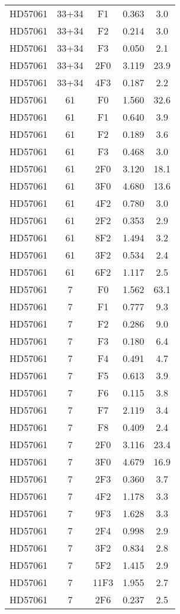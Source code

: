 \begin{table*}
\begin{tabular}{l c c c c}
HD57061 & 33+34 & F1 & 0.363 & 3.0\\ 
HD57061 & 33+34 & F2 & 0.214 & 3.0\\ 
HD57061 & 33+34 & F3 & 0.050 & 2.1\\ 
HD57061 & 33+34 & 2F0 & 3.119 & 23.9\\ 
HD57061 & 33+34 & 4F3 & 0.187 & 2.2\\ 
\hline
HD57061 & 61 & F0 & 1.560 & 32.6\\ 
HD57061 & 61 & F1 & 0.640 & 3.9\\ 
HD57061 & 61 & F2 & 0.189 & 3.6\\ 
HD57061 & 61 & F3 & 0.468 & 3.0\\ 
HD57061 & 61 & 2F0 & 3.120 & 18.1\\ 
HD57061 & 61 & 3F0 & 4.680 & 13.6\\ 
HD57061 & 61 & 4F2 & 0.780 & 3.0\\ 
HD57061 & 61 & 2F2 & 0.353 & 2.9\\ 
HD57061 & 61 & 8F2 & 1.494 & 3.2\\ 
HD57061 & 61 & 3F2 & 0.534 & 2.4\\ 
HD57061 & 61 & 6F2 & 1.117 & 2.5\\ 
\hline
HD57061 & 7 & F0 & 1.562 & 63.1\\ 
HD57061 & 7 & F1 & 0.777 & 9.3\\ 
HD57061 & 7 & F2 & 0.286 & 9.0\\ 
HD57061 & 7 & F3 & 0.180 & 6.4\\ 
HD57061 & 7 & F4 & 0.491 & 4.7\\ 
HD57061 & 7 & F5 & 0.613 & 3.9\\ 
HD57061 & 7 & F6 & 0.115 & 3.8\\ 
HD57061 & 7 & F7 & 2.119 & 3.4\\ 
HD57061 & 7 & F8 & 0.409 & 2.4\\ 
HD57061 & 7 & 2F0 & 3.116 & 23.4\\ 
HD57061 & 7 & 3F0 & 4.679 & 16.9\\ 
HD57061 & 7 & 2F3 & 0.360 & 3.7\\ 
HD57061 & 7 & 4F2 & 1.178 & 3.3\\ 
HD57061 & 7 & 9F3 & 1.628 & 3.3\\ 
HD57061 & 7 & 2F4 & 0.998 & 2.9\\ 
HD57061 & 7 & 3F2 & 0.834 & 2.8\\ 
HD57061 & 7 & 5F2 & 1.415 & 2.9\\ 
HD57061 & 7 & 11F3 & 1.955 & 2.7\\ 
HD57061 & 7 & 2F6 & 0.237 & 2.5\\ 

\end{tabular}
\end{table*}
